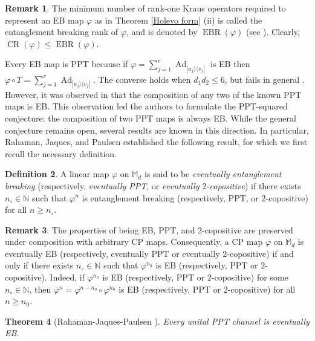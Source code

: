 \documentclass[11pt,reqno]{amsart}
\theoremstyle{definition}
\newtheorem{defn}{Definition}[section]
\newtheorem{rmk}[defn]{Remark}
\theoremstyle{plain}
\newtheorem{thm}[defn]{Theorem}
\theoremstyle{remark}
\newcommand{\la}{\langle}
\newcommand{\ra}{\rangle}
\numberwithin{equation}{section}%
\begin{document}
  
  \begin{rmk}
  	The minimum number of rank-one Kraus operators required to represent an EB map $\varphi$ as in Theorem \ref{Holevo form} (ii) is called the entanglement breaking rank of $\varphi$, and is denoted by $\operatorname{EBR}(\varphi)$ (see \cite{PPPR}). Clearly, $\operatorname{CR}(\varphi)\leq\operatorname{EBR}(\varphi)$.
  \end{rmk}
  
  
  Every EB map is PPT because if $\varphi=\sum_{j=1}^r\operatorname{Ad}_{|u_j\ra\la v_j|}$ is EB then $\varphi\circ T=\sum_{j=1}^r\operatorname{Ad}_{|u_j\ra\la \overline{v_j}|}$. The converse holds when $d_1d_2\leq 6$, but fails in general \cite{HHH, HO}. However, it was observed in \cite{BCHW} that the composition of any two of the known PPT maps is EB. This observation led the authors to formulate the PPT-squared conjecture: the composition of two PPT maps is always EB. While the general conjecture remains open, several results are known in this direction. In particular, Rahaman, Jaques, and Paulsen \cite{RJP} established the following result, for which we first recall the necessary definition.  
  
  \begin{defn}\label{defn of eventually EB}
  	A linear map $\varphi$ on $\mathbb{M}_d$ is said to be \textit{eventually entanglement breaking} (respectively, \textit{eventually PPT}, or \textit{eventually $2$-copositive}) if there exists $n_\circ\in\mathbb{N}$ such that $\varphi^n$ is entanglement breaking (respectively, PPT, or $2$-copositive) for all $n \ge n_\circ$. 
  \end{defn}
  
  
  \begin{rmk}
  	The properties of being EB, PPT, and $2$-copositive are preserved under composition with arbitrary CP maps. Consequently, a CP map $\varphi$ on $\mathbb{M}_d$ is eventually EB (respectively, eventually PPT or eventually $2$-copositive) if and only if there exists $n_\circ\in\mathbb{N}$ such that $\varphi^{n_0}$ is EB (respectively, PPT or $2$-copositive). Indeed, if $\varphi^{n_0}$ is EB (respectively, PPT or $2$-copositive) for some $n_\circ\in\mathbb{N}$, then $\varphi^n =  \varphi^{n-n_{0}}\circ\varphi^{n_0}$ is EB (respectively, PPT or $2$-copositive) for all $n \ge n_0$.
  \end{rmk}
 
  
  
  \begin{thm}[Rahaman-Jaques-Paulsen \cite{RJP}]\label{Rahaman's result}
  	Every unital PPT channel is eventually EB.
  \end{thm}
\end{document}
